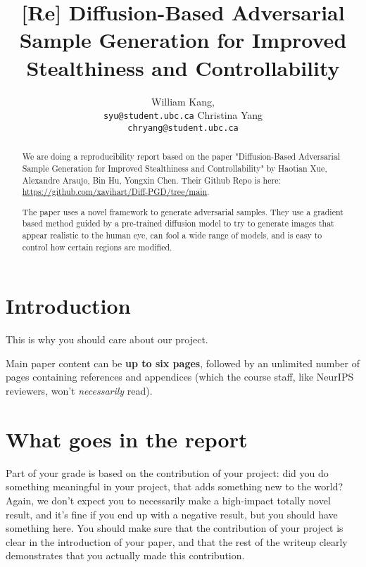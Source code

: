 \documentclass{article}
\title{[Re] Diffusion-Based Adversarial Sample Generation for Improved Stealthiness and Controllability}
\author{%
  William Kang,
  \\
  \texttt{syu@student.ubc.ca}
  \And
  Christina Yang\\
  \texttt{chryang@student.ubc.ca}
}
\begin{document}
\maketitle


\begin{abstract}
  We are doing a reproducibility report based on the paper "Diffusion-Based Adversarial Sample Generation for Improved Stealthiness and Controllability" by Haotian Xue, Alexandre Araujo, Bin Hu, Yongxin Chen. Their Github Repo is here: \url{https://github.com/xavihart/Diff-PGD/tree/main}.

  The paper uses a novel framework to generate adversarial samples. They use a gradient based method guided by a pre-trained diffusion model to try to generate images that appear realistic to the human eye, can fool a wide range of models, and is easy to control how certain regions are modified.
\end{abstract}


\section{Introduction}

This is why you should care about our project.

Main paper content can be \textbf{up to six pages},
followed by an unlimited number of pages containing references and appendices
(which the course staff, like NeurIPS reviewers, won't \emph{necessarily} read).

\section{What goes in the report}
Part of your grade is based on the contribution of your project:
did you do something meaningful in your project, that adds something new to the world?
Again, we don't expect you to necessarily make a high-impact totally novel result,
and it's fine if you end up with a negative result,
but you should have something here.
You should make sure that the contribution of your project is clear in the introduction of your paper,
and that the rest of the writeup clearly demonstrates that you actually made this contribution.
\end{document}
